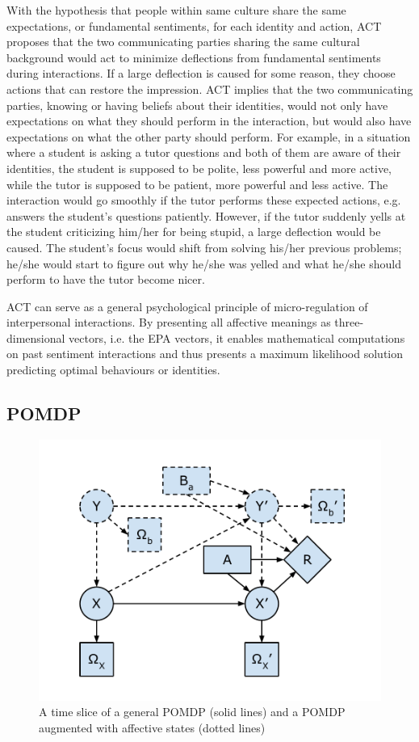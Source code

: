 With the hypothesis that people within same culture share the same expectations, or fundamental sentiments, for each identity and action, ACT proposes that the two communicating parties sharing the same cultural background would act to minimize deflections from fundamental sentiments during interactions. If a large deflection is caused for some reason, they choose actions that can restore the impression. ACT implies that the two communicating parties, knowing or having beliefs about their identities, would not only have expectations on what they should perform in the interaction, but would also have expectations on what the other party should perform. For example, in a situation where a student is asking a tutor questions and both of them are aware of their identities, the student is supposed to be polite, less powerful and more active, while the tutor is supposed to be patient, more powerful and less active. The interaction would go smoothly if the tutor performs these expected actions, e.g. answers the student's questions patiently. However, if the tutor suddenly yells at the student criticizing him/her for being stupid, a large deflection would be caused. The student's focus would shift from solving his/her previous problems; he/she would start to figure out why he/she was yelled and what he/she should perform to have the tutor become nicer.

ACT can serve as a general psychological principle of micro-regulation of interpersonal interactions. By presenting all affective meanings as three-dimensional vectors, i.e. the EPA vectors, it enables mathematical computations on past sentiment interactions and thus presents a maximum likelihood solution predicting optimal behaviours or identities. 

\subsection{POMDP}


\begin{figure}[htb]
\centering
\includegraphics[width=0.9\linewidth]{fig-pomdp.pdf}
\caption{A time slice of a general POMDP (solid lines) and a POMDP augmented with affective states (dotted lines)}
\label{fig:pomdp}
\end{figure}

